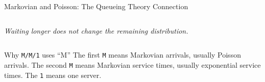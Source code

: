 \documentclass[aspectratio=169]{beamer}
\begin{document}
\begin{frame}{Markovian and Poisson: The Queueing Theory Connection}
\begin{columns}[T]
\begin{center}
\textit{Waiting longer does not change the remaining distribution.}
\end{center}

\end{columns}

\vspace{0.2cm}

\begin{alertblock}{Why \texttt{M/M/1} uses ``M''}
\centering
The first \texttt{M} means Markovian arrivals, usually Poisson arrivals.  
The second \texttt{M} means Markovian service times, usually exponential service times.  
The \texttt{1} means one server.
\end{alertblock}

\end{frame}
\end{document}
